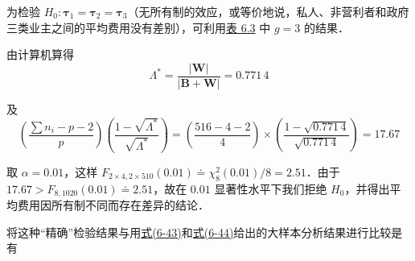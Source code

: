 为检验 $H_0:\boldsymbol{\tau}_1=\boldsymbol{\tau}_2=\boldsymbol{\tau}_3$（无所有制的效应，或等价地说，私人、非营利者和政府三类业主之间的平均费用没有差别），可利用\hyperref[tab:6.3]{表 6.3} 中 $g=3$ 的结果．

由计算机算得
\[
\Lambda^*=\frac{|\mathbf{W}|}{|\mathbf{B}+\mathbf{W}|}=0.771\,4
\]

及
\[
\left(\frac{\sum n_i-p-2}{p}\right)\left(\frac{1-\sqrt{\Lambda^*}}{\sqrt{\Lambda^*}}\right)
=\left(\frac{516-4-2}{4}\right)\times\left(\frac{1-\sqrt{0.771\,4}}{\sqrt{0.771\,4}}\right)=17.67
\]

取 $\alpha=0.01$，这样 $F_{2\times4,2\times510}(0.01)\doteq\chi_8^2(0.01)/8=2.51$．由于 $17.67>F_{8,1020}(0.01)\doteq2.51$，故在 $0.01$ 显著性水平下我们拒绝 $H_0$，并得出平均费用因所有制不同而存在差异的结论．

将这种“精确”检验结果与用\hyperref[eq:6-43]{式(6-43)}和\hyperref[eq:6-44]{式(6-44)}给出的大样本分析结果进行比较是有
